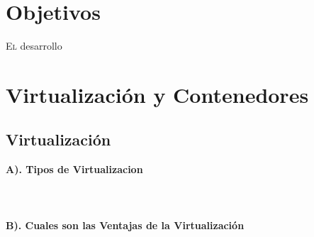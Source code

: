 \documentclass[twoside,twocolumn]{article}
\begin{document}
\section{Objetivos}
\begin{flushright}
\begin{itemize}
\lettrine[nindent=0em,lines=2]{E}l desarrollo



\section{Virtualización y Contenedores}

\subsection{Virtualización}


 \textbf{A). Tipos de Virtualizacion }\\
\textbf{}\\
\textbf{}\\
\textbf{}\\
 \textbf{B). Cuales son las Ventajas de la Virtualización}\\






\end{itemize}
\end{flushright}
\end{document}

